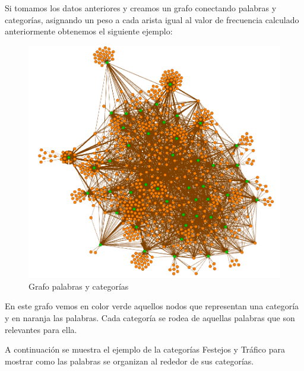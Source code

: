 Si tomamos los datos anteriores y creamos un grafo conectando palabras y categorías, asignando un peso a cada arista igual al valor de frecuencia calculado anteriormente obtenemos el siguiente ejemplo:


\begin{figure}[h]
\begin{center}
\includegraphics[scale=0.5]{Categorias/palabras_clave/grafocompleto.png} 
\caption{Grafo palabras y categorías}
\end{center}

\end{figure}

En este grafo vemos en color verde aquellos nodos que representan una categoría y en naranja las palabras. Cada categoría se rodea de aquellas palabras que son relevantes para ella. 

A continuación se muestra el ejemplo de la categorías Festejos y Tráfico para mostrar como las palabras se organizan al rededor de sus categorías.
 

